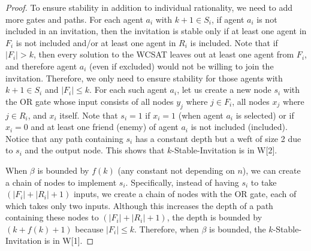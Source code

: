 \begin{proof}
	To ensure stability in addition to individual rationality, we need to add more gates and paths. 	
	For each agent $a_i$ with $k+1 \in S_i$, if agent $a_i$ is not included in an invitation, then the invitation is stable only if at least one agent in $F_i$ is not included and/or at least one agent in $R_i$ is included.
	Note that if $|F_i| > k$, then every solution to the WCSAT leaves out at least one agent from $F_i$, and therefore agent $a_i$ (even if excluded) would not be willing to join the invitation. Therefore, we only need to ensure stability for those agents with $k+1\in S_i$ and $|F_i| \leq k$. 
	For each such agent $a_i$, let us create a new node $s_i$ with the OR gate whose input consists of all nodes $y_j$ where $j\in F_i$, all nodes $x_j$ where $j \in R_i$, and $x_i$ itself. Note that $s_i = 1$ if $x_i = 1$ (when agent $a_i$ is selected) or if $x_i = 0$ and at least one friend (enemy) of agent $a_i$ is not included (included). Notice that any path containing $s_i$ has a constant depth but a weft of size 2 due to $s_i$ and the output node. This shows that $k$-Stable-Invitation is in W[2].
	
	When $\beta$ is bounded by $f(k)$ (any constant not depending on $n$), we can create a chain of nodes to implement $s_i$. Specifically, instead of having $s_i$ to take $(|F_i| + |R_i| + 1)$ inputs, we create a chain of nodes with the OR gate, each of which takes only two inputs. Although this increases the depth of a path containing these nodes to $(|F_i| + |R_i| + 1)$, the depth is bounded by $(k + f(k) + 1)$ because $|F_i| \leq k$. Therefore, when $\beta$ is bounded, the $k$-Stable-Invitation is in W[1].	
\end{proof}

